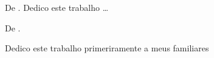 \begin{dedicatoria}
	\vspace*{\fill}
	
	De \imprimirAutorUm.
	\newline
	Dedico este trabalho \ldots 
	
	\vspace*{\fill}
	De \imprimirAutorDois.
	\newline
	\par Dedico este trabalho primeriramente a meus familiares

\end{dedicatoria}
